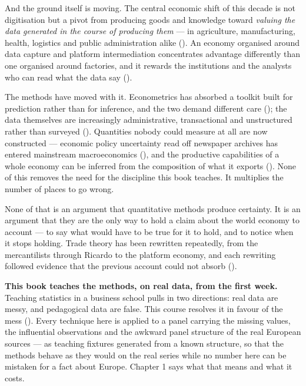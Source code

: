 \documentclass[
  letterpaper,
  10pt,
  twoside,
  openright,
  numbers=noenddot,
  chapterprefix=true]{scrbook}
\begin{document}
And the ground itself is moving. The central economic shift of this
decade is not digitisation but a pivot from producing goods and
knowledge toward \emph{valuing the data generated in the course of
producing them} --- in agriculture, manufacturing, health, logistics and
public administration alike (). An economy organised around data capture and platform
intermediation concentrates advantage differently than one organised
around factories, and it rewards the institutions and the analysts who
can read what the data say ().

The methods have moved with it. Econometrics has absorbed a toolkit
built for prediction rather than for inference, and the two demand
different care (); the data
themselves are increasingly administrative, transactional and
unstructured rather than surveyed (). Quantities nobody could measure at all are now constructed
--- economic policy uncertainty read off newspaper archives has entered
mainstream macroeconomics (), and the productive capabilities of a whole economy can be
inferred from the composition of what it exports
(). None of this
removes the need for the discipline this book teaches. It multiplies the
number of places to go wrong.

None of that is an argument that quantitative methods produce certainty.
It is an argument that they are the only way to hold a claim about the
world economy to account --- to say what would have to be true for it to
hold, and to notice when it stops holding. Trade theory has been
rewritten repeatedly, from the mercantilists through Ricardo to the
platform economy, and each rewriting followed evidence that the previous
account could not absorb ().

\begin{qmibstep}

\textbf{This book teaches the methods, on real data, from the first
week.} Teaching statistics in a business school pulls in two directions:
real data are messy, and pedagogical data are false. This course
resolves it in favour of the mess (). Every technique here is applied to a panel carrying the missing
values, the influential observations and the awkward panel structure of
the real European sources --- as teaching fixtures generated from a
known structure, so that the methods behave as they would on the real
series while no number here can be mistaken for a fact about Europe.
Chapter 1 says what that means and what it costs.

\end{qmibstep}
\end{document}
